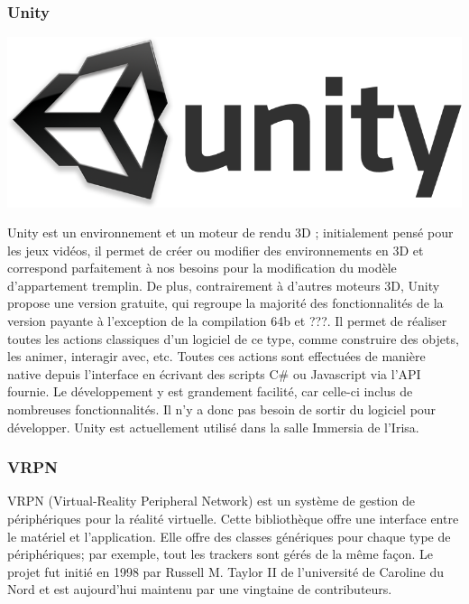 	
	\subsubsection{Unity}
		\noindent\begin{minipage}{0.3\textwidth}
			\includegraphics[width=\linewidth]{1-PreEtude/img/unity_logo}
			\end{minipage}
			\hfill
			\begin{minipage}{0.6\textwidth}\raggedleft
			Unity est un environnement et un moteur de rendu 3D ; initialement pensé pour les jeux vidéos, il permet de créer ou modifier des environnements en 3D et correspond parfaitement à nos besoins pour la modification du modèle d’appartement tremplin.
			De plus, contrairement à d’autres moteurs 3D, Unity propose une version gratuite, qui regroupe la majorité des fonctionnalités de la version payante à l'exception de la compilation 64b et ???.
			Il permet de réaliser toutes les actions classiques d'un logiciel de ce type, comme construire des objets, les animer, interagir avec, etc. Toutes ces actions sont effectuées de manière native depuis l'interface en écrivant des scripts C\# ou Javascript via l'API fournie.
			Le développement y est grandement facilité, car celle-ci inclus de nombreuses fonctionnalités. Il n'y a donc pas besoin de sortir du logiciel pour développer.
			Unity est actuellement utilisé dans la salle Immersia de l’Irisa.
		\end{minipage}
		      

	\subsubsection{VRPN}
	
		VRPN (Virtual-Reality Peripheral Network) est un système de gestion de périphériques pour la réalité virtuelle. Cette bibliothèque offre une interface entre le matériel et l'application. Elle offre des classes génériques pour chaque type de périphériques; par exemple, tout les trackers sont gérés de la même façon.
		Le projet fut initié en 1998 par Russell M. Taylor II de l'université de Caroline du Nord et est aujourd'hui maintenu par une vingtaine de contributeurs.
	
